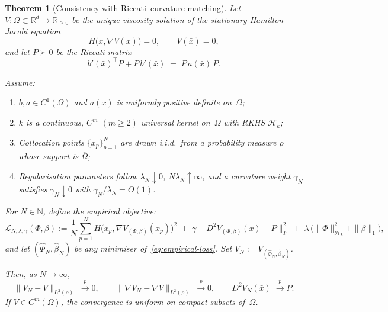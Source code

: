 \documentclass[11pt]{article}
\theoremstyle{plain}      %
\newtheorem{theorem}{Theorem}[section]     %
\theoremstyle{definition} %
\begin{document}
\begin{theorem}[Consistency with Riccati–curvature matching]\label{thm:consistency-curvature}
Let $V:\Omega\subset\mathbb R^{d}\to\mathbb R_{\ge0}$ be the unique viscosity solution of the stationary Hamilton--Jacobi equation
\[
  H\bigl(x,\nabla V(x)\bigr)=0,\qquad V(\bar x)=0,
\]
and let $P\succ0$ be the Riccati matrix
\[
  b'(\bar x)^{\!\top}P + P\,b'(\bar x) \;=\; P\,a(\bar x)\,P.
\]

\medskip\noindent
Assume:
\begin{enumerate}
  \item\label{A1} $b,a\in C^{1}(\Omega)$ and $a(x)$ is uniformly positive definite on~$\Omega$;
  \item\label{A2} $k$ is a continuous, $C^{m}$ $(m\!\ge2)$ \emph{universal} kernel on~$\Omega$ with RKHS $\mathcal H_{k}$;
  \item\label{A3} Collocation points $\{x_{p}\}_{p=1}^{N}$ are drawn i.i.d.\ from a probability measure $\rho$ whose support is $\overline\Omega$;
  \item\label{A4} Regularisation parameters follow
        $\lambda_{N}\!\downarrow\!0$, $N\lambda_{N}\!\uparrow\!\infty$,
        and a curvature weight $\gamma_{N}$ satisfies
        $\gamma_{N}\!\downarrow\!0$ with $\gamma_{N}/\lambda_{N}=O(1)$.
\end{enumerate}

\medskip\noindent
For $N\in\mathbb N$, define the empirical objective:
\begin{equation}\label{eq:empirical-loss}
  \mathcal L_{N,\lambda,\gamma}(\Phi,\beta)
  := \frac1N\sum_{p=1}^{N} %
     H\!\bigl(x_{p},\nabla V_{(\Phi,\beta)}(x_{p})\bigr)^{2}
     \;+\;
     \gamma\,\!\bigl\|D^{2}V_{(\Phi,\beta)}(\bar x)-P\bigr\|_{F}^{2}
     \;+\;
     \lambda\,\!\bigl(\|\Phi\|^{2}_{\mathcal H_{k}} + \|\beta\|_{1}\bigr),
\end{equation}
and let $(\widehat\Phi_{N},\widehat\beta_{N})$ be any minimiser of~\eqref{eq:empirical-loss}.
Set $V_{N}:=V_{(\widehat\Phi_{N},\widehat\beta_{N})}$.

\medskip\noindent
Then, as $N\to\infty$,
\[
  \|V_{N}-V\|_{L^{2}(\rho)} \;\xrightarrow{\;p\;} 0,
  \qquad
  \|\nabla V_{N}-\nabla V\|_{L^{2}(\rho)}
     \;\xrightarrow{\;p\;} 0,
  \qquad
  D^{2}V_{N}(\bar x)\;\xrightarrow{\;p\;} P.
\]
If $V\in C^{m}(\Omega)$, the convergence is uniform on compact subsets of~$\Omega$.
\end{theorem}

\end{document}
